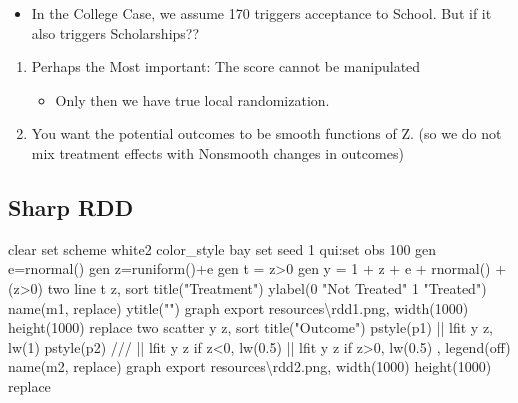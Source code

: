 \documentclass[
  letterpaper,
  DIV=11,
  numbers=noendperiod]{scrartcl}
\newenvironment{Shaded}{\begin{snugshade}}{\end{snugshade}}
\newcommand{\BaseNTok}[1]{\textcolor[rgb]{0.68,0.00,0.00}{#1}}
\newcommand{\CommentTok}[1]{\textcolor[rgb]{0.37,0.37,0.37}{#1}}
\newcommand{\DecValTok}[1]{\textcolor[rgb]{0.68,0.00,0.00}{#1}}
\newcommand{\FunctionTok}[1]{\textcolor[rgb]{0.28,0.35,0.67}{#1}}
\newcommand{\KeywordTok}[1]{\textcolor[rgb]{0.00,0.23,0.31}{#1}}
\newcommand{\NormalTok}[1]{\textcolor[rgb]{0.00,0.23,0.31}{#1}}
\newcommand{\StringTok}[1]{\textcolor[rgb]{0.13,0.47,0.30}{#1}}
\providecommand{\tightlist}{%
  \setlength{\itemsep}{0pt}\setlength{\parskip}{0pt}}\usepackage{longtable,booktabs,array}
\begin{document}
\begin{itemize}
\tightlist
\item
  In the College Case, we assume 170 triggers acceptance to School. But
  if it also triggers Scholarships??
\end{itemize}

\begin{enumerate}
\def\labelenumi{\arabic{enumi}.}
\setcounter{enumi}{3}
\item
  Perhaps the Most important: The score cannot be manipulated

  \begin{itemize}
  \tightlist
  \item
    Only then we have true local randomization.
  \end{itemize}
\item
  You want the potential outcomes to be smooth functions of Z. (so we do
  not mix treatment effects with Nonsmooth changes in outcomes)
\end{enumerate}

\subsection{Sharp RDD}\label{sharp-rdd}

\begin{Shaded}
\begin{Highlighting}[]
\KeywordTok{clear}
\KeywordTok{set} \DecValTok{scheme}\NormalTok{ white2}
\NormalTok{color\_style bay}
\KeywordTok{set} \DecValTok{seed}\NormalTok{ 1}
\KeywordTok{qui}\NormalTok{:}\KeywordTok{set} \KeywordTok{obs}\NormalTok{ 100}
\KeywordTok{gen} \FunctionTok{e}\NormalTok{=rnormal()}
\KeywordTok{gen}\NormalTok{ z=runiform()+}\FunctionTok{e}
\KeywordTok{gen}\NormalTok{ t = z\textgreater{}0}
\KeywordTok{gen} \FunctionTok{y}\NormalTok{ = 1 + z + }\FunctionTok{e}\NormalTok{ + rnormal() + (z\textgreater{}0)}
\KeywordTok{two} \KeywordTok{line}\NormalTok{ t z, }\KeywordTok{sort} \BaseNTok{title}\NormalTok{(}\StringTok{"Treatment"}\NormalTok{) }\KeywordTok{ylabel}\NormalTok{(0 }\StringTok{"Not Treated"}\NormalTok{ 1 }\StringTok{"Treated"}\NormalTok{) }\BaseNTok{name}\NormalTok{(m1, }\KeywordTok{replace}\NormalTok{) }\BaseNTok{ytitle}\NormalTok{(}\StringTok{""}\NormalTok{)}
\KeywordTok{graph} \KeywordTok{export}\NormalTok{ resources\textbackslash{}rdd1.png,  }\KeywordTok{width}\NormalTok{(1000) height(1000) }\KeywordTok{replace}
\KeywordTok{two} \KeywordTok{scatter} \FunctionTok{y}\NormalTok{ z, }\KeywordTok{sort} \BaseNTok{title}\NormalTok{(}\StringTok{"Outcome"}\NormalTok{) pstyle(p1) || }\KeywordTok{lfit} \FunctionTok{y}\NormalTok{ z, lw(1) pstyle(p2) }\CommentTok{///}
\NormalTok{    || }\KeywordTok{lfit} \FunctionTok{y}\NormalTok{ z }\KeywordTok{if}\NormalTok{ z\textless{}0, lw(0.5) || }\KeywordTok{lfit} \FunctionTok{y}\NormalTok{ z }\KeywordTok{if}\NormalTok{ z\textgreater{}0, lw(0.5) , }\BaseNTok{legend}\NormalTok{(}\KeywordTok{off}\NormalTok{) }\BaseNTok{name}\NormalTok{(m2, }\KeywordTok{replace}\NormalTok{)}
\KeywordTok{graph} \KeywordTok{export}\NormalTok{ resources\textbackslash{}rdd2.png,  }\KeywordTok{width}\NormalTok{(1000) height(1000)  }\KeywordTok{replace}
\end{Highlighting}
\end{Shaded}
\end{document}
